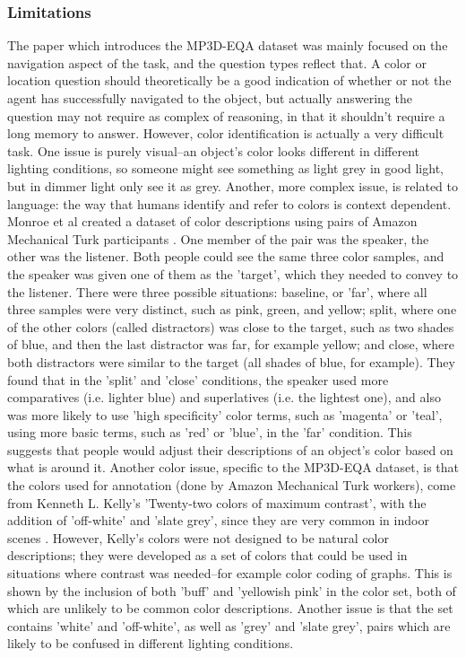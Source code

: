 \subsubsection{Limitations}
The paper which introduces the MP3D-EQA dataset was mainly focused on the navigation aspect of the task, and the question types reflect that. A color or location question should theoretically be a good indication of whether or not the agent has successfully navigated to the object, but actually answering the question may not require as complex of reasoning, in that it shouldn't require a long memory to answer. \newline
However, color identification is actually a very difficult task. One issue is purely visual--an object's color looks different in different lighting conditions, so someone might see something as light grey in good light, but in dimmer light only see it as grey. Another, more complex issue, is related to language: the way that humans identify and refer to colors is context dependent. Monroe et al created a dataset of color descriptions using pairs of Amazon Mechanical Turk participants \cite{colorsincontext}. One member of the pair was the speaker, the other was the listener. Both people could see the same three color samples, and the speaker was given one of them as the 'target', which they needed to convey to the listener. There were three possible situations: baseline, or 'far', where all three samples were very distinct, such as pink, green, and yellow; split, where one of the other colors (called distractors) was close to the target, such as two shades of blue, and then the last distractor was far, for example yellow; and close, where both distractors were similar to the target (all shades of blue, for example). They found that in the 'split' and 'close' conditions, the speaker used more comparatives (i.e. lighter blue) and superlatives (i.e. the lightest one), and also was more likely to use 'high specificity' color terms, such as 'magenta' or 'teal', using more basic terms, such as 'red' or 'blue', in the 'far' condition. This suggests that people would adjust their descriptions of an object's color based on what is around it. \newline
Another color issue, specific to the MP3D-EQA dataset, is that the colors used for annotation (done by Amazon Mechanical Turk workers), come from Kenneth L. Kelly's 'Twenty-two colors of maximum contrast', with the addition of 'off-white' and 'slate grey', since they are very common in indoor scenes \cite{kellycolors}. However, Kelly's colors were not designed to be natural color descriptions; they were developed as a set of colors that could be used in situations where contrast was needed--for example color coding of graphs. This is shown by the inclusion of both 'buff' and 'yellowish pink' in the color set, both of which are unlikely to be common color descriptions. Another issue is that the set contains 'white' and 'off-white', as well as 'grey' and 'slate grey', pairs which are likely to be confused in different lighting conditions.\newline
